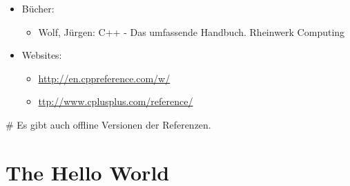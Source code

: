 \documentclass[a4paper]{report}
\begin{document}
\begin{itemize}
	\item Bücher:
	\begin{itemize}
		\item Wolf, Jürgen: C++ - Das umfassende Handbuch. Rheinwerk Computing
	\end{itemize}
	\item Websites:
	\begin{itemize}
		\item \url{http://en.cppreference.com/w/}
		\item \url{ttp://www.cplusplus.com/reference/}
	\end{itemize}
\end{itemize}
\# Es gibt auch offline Versionen der Referenzen.



\section{The Hello World}
\end{document}
